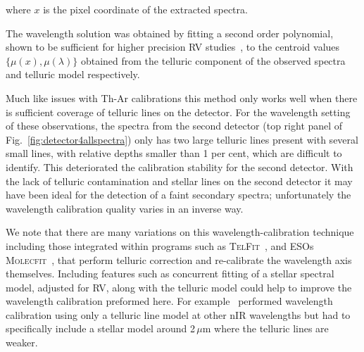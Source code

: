 \documentclass[fleqn,usenatbib]{mnras}
\begin{document}
where \(x\) is the pixel coordinate of the extracted spectra.

The wavelength solution was obtained by fitting a second order polynomial, shown to be sufficient for higher precision RV studies~\citep[e.g.][]{bean_groundbased_2010, figueira_radial_2010, seifahrt_synthesising_2010}, to the centroid values \(\{\mu(x), \mu(\lambda)\}\) obtained from the telluric component of the observed spectra and telluric model respectively.

Much like issues with Th-Ar calibrations this method only works well when there is sufficient coverage of telluric lines on the detector. For the wavelength setting of these observations, the spectra from the second detector (top right panel of Fig.~\ref{fig:detector4allspectra}) only has two large telluric lines present with several small lines, with relative depths smaller than 1 per cent, which are difficult to identify. This deteriorated the calibration stability for the second detector. With the lack of telluric contamination and stellar lines on the second detector it may have been ideal for the detection of a faint secondary spectra; unfortunately the wavelength calibration quality varies in an inverse way.

We note that there are many variations on this wavelength-calibration technique including those integrated within programs such as \textsc{TelFit}~\citet{gullikson_correcting_2014}, and ESOs \textsc{Molecfit}~\citet{smette_molecfit_2015}, that perform telluric correction and re-calibrate the wavelength axis themselves. {Including features such as concurrent fitting of a stellar spectral model, adjusted for RV, along with the telluric model could help to improve the wavelength calibration preformed here. For example~\citet{piskorz_evidence_2016} performed wavelength calibration using only a telluric line model at other nIR wavelengths but had to specifically include a stellar model around 2\,$\mu$m where the telluric lines are weaker.}
\end{document}
